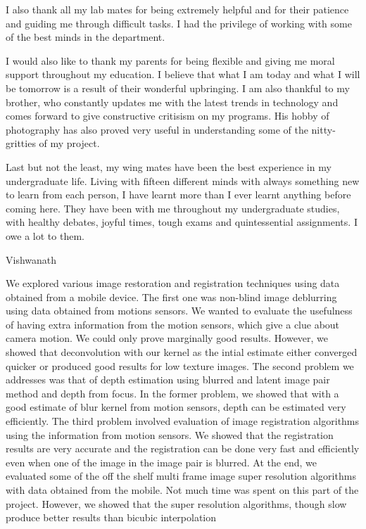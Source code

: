 \documentclass[BTech]{iitmdiss}
\begin{document}
I also thank all my lab mates for being extremely helpful and
for their patience and guiding me through difficult tasks. I had the
privilege of working with some of the best minds in the department.

I would also like to thank my parents for being flexible and giving me moral
support throughout my education. I believe that what I am today and what
I will be tomorrow is a result of their wonderful upbringing. I  am also
thankful to my brother, who constantly updates me with the latest trends
in technology and comes forward to give constructive critisism on my
programs. His hobby of photography has also proved very useful in 
understanding some of the nitty-gritties of my project.

Last but not the least, my wing mates have been the best 
experience in my undergraduate life. Living with fifteen different minds
with always something new to learn from each person, I have learnt more
than I ever learnt anything before coming here. They have been with me
throughout my undergraduate studies, with healthy debates, joyful times,
tough exams and quintessential assignments. I owe a lot to them.

\raggedright{Vishwanath}

\abstract
We explored various image restoration and registration techniques using 
data obtained from a mobile device. The first one was non-blind image
deblurring using data obtained from motions sensors. We wanted to evaluate
the usefulness of having extra information from the motion sensors, which
give a clue about camera motion. We could only prove marginally good 
results. However, we showed that deconvolution with our kernel as the 
intial estimate either converged quicker or produced good results for low
texture images. The second problem we addresses was that of depth estimation using blurred and latent image pair method and depth from focus. In the former
problem, we showed that with a good estimate of blur kernel from motion
sensors, depth can be estimated very efficiently. The third problem 
involved evaluation of image registration algorithms using the information
from motion sensors. We showed that the registration results are very 
accurate and the registration can be done very fast and efficiently even
when one of the image in the image pair is blurred. At the end, we 
evaluated some of the off the shelf multi frame image super resolution algorithms with data obtained from the mobile. Not much time was spent on
this part of the project. However, we showed that the super resolution
algorithms, though slow produce better results than bicubic interpolation
\end{document}
